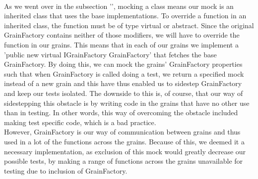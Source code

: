 \\
As we went over in the subsection '', mocking a class means our mock is an inherited class that uses the base implementations. To override a function in an inherited class, the function must be of type virtual or abstract. Since the original GrainFactory contains neither of those modifiers, we will have to override the function in our grains. This means that in each of our grains we implement a 'public new virtual IGrainFactory GrainFactory' that fetches the base GrainFactory. By doing this, we can mock the grains' GrainFactory properties such that when GrainFactory is called doing a test, we return a specified mock instead of a new grain and this have thus enabled us to sidestep GrainFactory and keep our tests isolated. The downside to this is, of course, that our way of sidestepping this obstacle is by writing code in the grains that have no other use than in testing. In other words, this way of overcoming the obstacle included making test specific code, which is a bad practice. \\
However, GrainFactory is our way of communication between grains and thus used in a lot of the functions across the grains. Because of this, we deemed it a necessary implementation, as exclusion of this mock would greatly decrease our possible tests, by making a range of functions across the grains unavailable for testing due to inclusion of GrainFactory.
